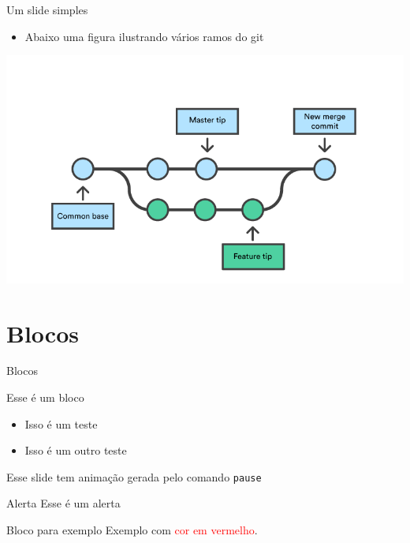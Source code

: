 \documentclass{beamer}
\begin{document}
\begin{frame}[wide]{Um slide simples}
\begin{itemize}
    \item Abaixo uma figura ilustrando vários ramos do git
\end{itemize}
\begin{center}
    \includegraphics[width=.8\linewidth]{figs/git-branch}
\end{center}
\end{frame}


\section{Blocos}


\begin{frame}{Blocos}
	\begin{block}{Esse é um bloco}
    \begin{itemize}
        \item Isso é um teste
        \item Isso é um outro teste
    \end{itemize}
	\end{block}

	\begin{block}{}
	    Esse slide tem animação gerada pelo comando \texttt{pause}
	\end{block}

    \pause

	\begin{alertblock}{Alerta}
        Esse é um alerta
	\end{alertblock}

	\begin{exampleblock}{Bloco para exemplo}
        Exemplo com \textcolor{red}{cor em vermelho}.
    \end{exampleblock}

\end{frame}
\end{document}
